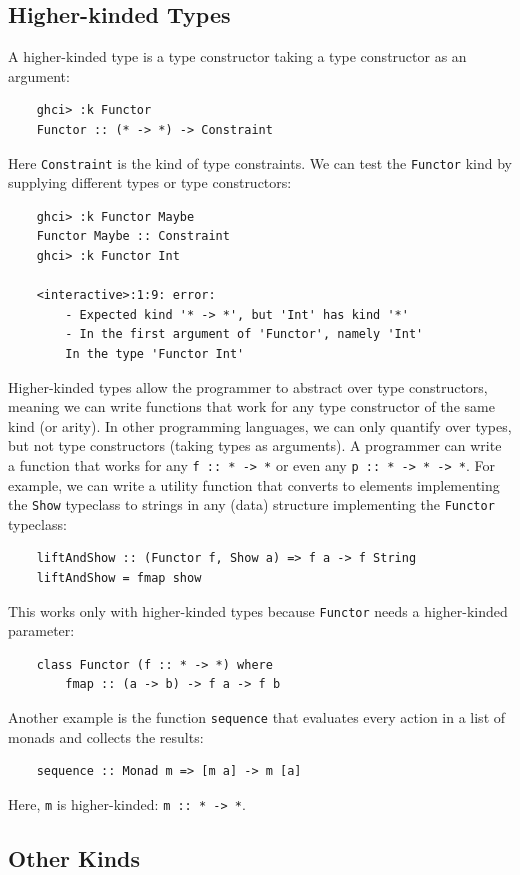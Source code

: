 \documentclass[12pt,oneside,a4paper]{article}
\begin{document}
\subsection{Higher-kinded Types}
A higher-kinded type is a type constructor taking a type constructor as an argument:
\begin{lstlisting}
    ghci> :k Functor
    Functor :: (* -> *) -> Constraint
\end{lstlisting}
Here \texttt{Constraint} is the kind of type constraints. We can test the \texttt{Functor} kind by supplying different types or type constructors:
\begin{lstlisting}
    ghci> :k Functor Maybe
    Functor Maybe :: Constraint
    ghci> :k Functor Int

    <interactive>:1:9: error:
        - Expected kind '* -> *', but 'Int' has kind '*'
        - In the first argument of 'Functor', namely 'Int'
        In the type 'Functor Int'
\end{lstlisting}
Higher-kinded types allow the programmer to abstract over type constructors, meaning we can write functions that work for any type constructor of the same kind (or arity). In other programming languages, we can only quantify over types, but not type constructors (taking types as arguments). A programmer can write a function that works for any \texttt{f :: * -> *} or even any \texttt{p :: * -> * -> *}. For example, we can write a utility function that converts to elements implementing the \texttt{Show} typeclass to strings in any (data) structure implementing the \texttt{Functor} typeclass:
\begin{lstlisting}
    liftAndShow :: (Functor f, Show a) => f a -> f String
    liftAndShow = fmap show
\end{lstlisting}
This works only with higher-kinded types because \texttt{Functor} needs a higher-kinded parameter:
\begin{lstlisting}
    class Functor (f :: * -> *) where
        fmap :: (a -> b) -> f a -> f b
\end{lstlisting}
Another example is the function \texttt{sequence} that evaluates every action in a list of monads and collects the results:
\begin{lstlisting}
    sequence :: Monad m => [m a] -> m [a]
\end{lstlisting}
Here, \texttt{m} is higher-kinded: \texttt{m :: * -> *}.



\subsection{Other Kinds}
\end{document}
